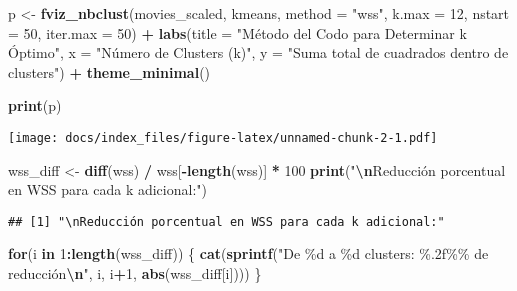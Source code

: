 \documentclass[
]{article}
\newenvironment{Shaded}{\begin{snugshade}}{\end{snugshade}}
\newcommand{\AttributeTok}[1]{\textcolor[rgb]{0.13,0.29,0.53}{#1}}
\newcommand{\ControlFlowTok}[1]{\textcolor[rgb]{0.13,0.29,0.53}{\textbf{#1}}}
\newcommand{\DecValTok}[1]{\textcolor[rgb]{0.00,0.00,0.81}{#1}}
\newcommand{\FunctionTok}[1]{\textcolor[rgb]{0.13,0.29,0.53}{\textbf{#1}}}
\newcommand{\NormalTok}[1]{#1}
\newcommand{\OtherTok}[1]{\textcolor[rgb]{0.56,0.35,0.01}{#1}}
\newcommand{\SpecialCharTok}[1]{\textcolor[rgb]{0.81,0.36,0.00}{\textbf{#1}}}
\newcommand{\StringTok}[1]{\textcolor[rgb]{0.31,0.60,0.02}{#1}}
\begin{document}
\begin{Shaded}
\begin{Highlighting}[]
\NormalTok{p }\OtherTok{\textless{}{-}} \FunctionTok{fviz\_nbclust}\NormalTok{(movies\_scaled, }
\NormalTok{             kmeans, }
             \AttributeTok{method =} \StringTok{"wss"}\NormalTok{,}
             \AttributeTok{k.max =} \DecValTok{12}\NormalTok{,  }
             \AttributeTok{nstart =} \DecValTok{50}\NormalTok{,  }
             \AttributeTok{iter.max =} \DecValTok{50}\NormalTok{) }\SpecialCharTok{+}  
  \FunctionTok{labs}\NormalTok{(}\AttributeTok{title =} \StringTok{"Método del Codo para Determinar k Óptimo"}\NormalTok{,}
       \AttributeTok{x =} \StringTok{"Número de Clusters (k)"}\NormalTok{,}
       \AttributeTok{y =} \StringTok{"Suma total de cuadrados dentro de clusters"}\NormalTok{) }\SpecialCharTok{+}
  \FunctionTok{theme\_minimal}\NormalTok{()}

\FunctionTok{print}\NormalTok{(p)}
\end{Highlighting}
\end{Shaded}

\texttt{[image: docs/index\_files/figure-latex/unnamed-chunk-2-1.pdf]}

\begin{Shaded}
\begin{Highlighting}[]
\NormalTok{wss\_diff }\OtherTok{\textless{}{-}} \FunctionTok{diff}\NormalTok{(wss) }\SpecialCharTok{/}\NormalTok{ wss[}\SpecialCharTok{{-}}\FunctionTok{length}\NormalTok{(wss)] }\SpecialCharTok{*} \DecValTok{100}
\FunctionTok{print}\NormalTok{(}\StringTok{"}\SpecialCharTok{\textbackslash{}n}\StringTok{Reducción porcentual en WSS para cada k adicional:"}\NormalTok{)}
\end{Highlighting}
\end{Shaded}

\begin{verbatim}
## [1] "\nReducción porcentual en WSS para cada k adicional:"
\end{verbatim}

\begin{Shaded}
\begin{Highlighting}[]
\ControlFlowTok{for}\NormalTok{(i }\ControlFlowTok{in} \DecValTok{1}\SpecialCharTok{:}\FunctionTok{length}\NormalTok{(wss\_diff)) \{}
  \FunctionTok{cat}\NormalTok{(}\FunctionTok{sprintf}\NormalTok{(}\StringTok{"De \%d a \%d clusters: \%.2f\%\% de reducción}\SpecialCharTok{\textbackslash{}n}\StringTok{"}\NormalTok{, }
\NormalTok{              i, i}\SpecialCharTok{+}\DecValTok{1}\NormalTok{, }\FunctionTok{abs}\NormalTok{(wss\_diff[i])))}
\NormalTok{\}}
\end{Highlighting}
\end{Shaded}
\end{document}
